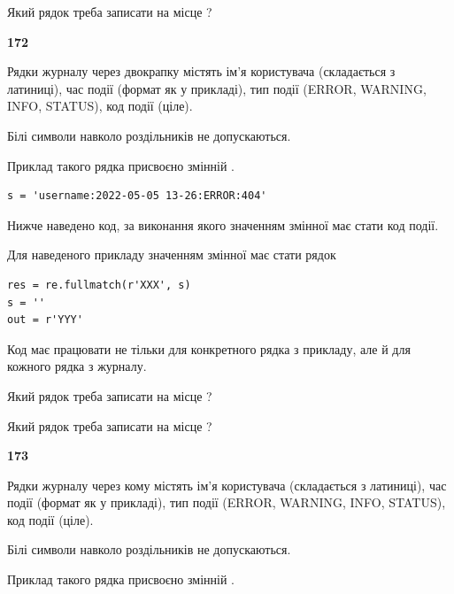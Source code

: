 Який рядок треба записати на місце  ?\par


\newpage

{\begin {center}\textbf{ 172}\end {center}}\par
Рядки журналу через двокрапку містять ім'я користувача (складається з латиниці), час події (фор\-мат як у прикладі), тип події (ERROR, WARNING, INFO, STATUS), код події (ціле).

Білі символи навколо роздільників не допускаються.

Приклад такого рядка присвоєно змінній .



\begin{verbatim}
s = 'username:2022-05-05 13-26:ERROR:404'
\end{verbatim}


Нижче наведено код, за виконання якого значенням змінної  має стати код події.

Для наведеного прикладу значенням змінної  має стати рядок 



\begin{verbatim}
res = re.fullmatch(r'XXX', s)
s = ''
out = r'YYY'
\end{verbatim}


Код має працювати не тільки для конкретного рядка з прикладу, але й для кожного рядка з журналу.




Який рядок треба записати на місце  ?\par
\vspace{5mm}


Який рядок треба записати на місце  ?\par


\newpage

{\begin {center}\textbf{ 173}\end {center}}\par
Рядки журналу через кому містять ім'я користувача (складається з латиниці), час події (фор\-мат як у прикладі), тип події (ERROR, WARNING, INFO, STATUS), код події (ціле).

Білі символи навколо роздільників не допускаються.

Приклад такого рядка присвоєно змінній .



